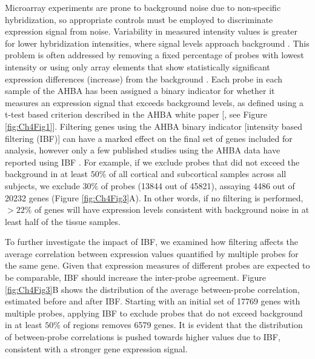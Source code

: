 Microarray experiments are prone to background noise due to non-specific hybridization, so appropriate controls must be employed to discriminate expression signal from noise. Variability in measured intensity values is greater for lower hybridization intensities, where signal levels approach background \citep{Quackenbush2002a}. This problem is often addressed by removing a fixed percentage of probes with lowest intensity or using only array elements that show statistically significant expression differences (increase) from the background \citep{Quackenbush2002a}. Each probe in each sample of the AHBA has been assigned a binary indicator for whether it measures an expression signal that exceeds background levels, as defined using a t-test based criterion described in the AHBA white paper [\citep{AHBAdoc}, see Figure \ref{fig:Ch4Fig1}]. Filtering genes using the AHBA binary indicator [intensity based filtering (IBF)] can have a marked effect on the final set of genes included for analysis, however only a few published studies using the AHBA data have reported using IBF \citep{Hawrylycz2012,Richiardi2015,Burt2018}. For example, if we exclude probes that did not exceed the background in at least $50\%$ of all cortical and subcortical samples across all subjects, we exclude $30\%$ of probes (\num{13844} out of \num{45821}), assaying \num{4486} out of \num{20232} genes (Figure \ref{fig:Ch4Fig3}A). In other words, if no filtering is performed, $>22\%$ of genes will have expression levels consistent with background noise in at least half of the tissue samples.

To further investigate the impact of IBF, we examined how filtering affects the average correlation between expression values quantified by multiple probes for the same gene. Given that expression measures of different probes are expected to be comparable, IBF should increase the inter-probe agreement. Figure \ref{fig:Ch4Fig3}B shows the distribution of the average between-probe correlation, estimated before and after IBF. Starting with an initial set of \num{17769} genes with multiple probes, applying IBF to exclude probes that do not exceed background in at least $50\%$ of regions removes \num{6579} genes. It is evident that the distribution of between-probe correlations is pushed towards higher values due to IBF, consistent with a stronger gene expression signal.

